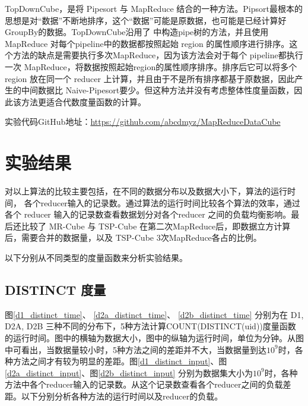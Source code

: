 TopDownCube，是将 Pipesort 与 MapReduce 结合的一种方法。Pipsort最根本的思想是对``数据”不断地排序，这个``数据”可能是原数据，也可能是已经计算好GroupBy的数据。TopDownCube沿用了\cite{agarwal1996computation} 中构造pipe树的方法，并且使用 MapReduce 对每个pipeline中的数据都按照起始 region 的属性顺序进行排序。这个方法的缺点是需要执行多次MapReduce，因为该方法会对于每个 pipeline都执行一次 MapReduce，将数据按照起始region的属性顺序排序。排序后它可以将多个 region 放在同一个 reducer 上计算，并且由于不是所有排序都基于原数据，因此产生的中间数据比 Naive-Pipesort要少。但这种方法并没有考虑整体性度量函数，因此该方法更适合代数度量函数的计算。

实验代码GitHub地址：\url{https://github.com/abcdmyz/MapReduceDataCube}

\section{实验结果}

对以上算法的比较主要包括，在不同的数据分布以及数据大小下，算法的运行时间， 各个reducer输入的记录数。通过算法的运行时间比较各个算法的效率，通过各个 reducer 输入的记录数查看数据划分对各个reducer 之间的负载均衡影响。最后还比较了 MR-Cube 与 TSP-Cube 在第二次MapReduce后，即数据立方计算后，需要合并的数据量，以及 TSP-Cube 3次MapReduce各占的比例。

以下分别从不同类型的度量函数来分析实验结果。

\subsection{DISTINCT 度量}


图\ref{d1_distinct_time}、 \ref{d2a_distinct_time}、 \ref{d2b_distinct_time} 分别为在 D1, D2A, D2B 三种不同的分布下，5种方法计算COUNT(DISTINCT(uid))度量函数的运行时间。图中的横轴为数据大小，图中的纵轴为运行时间，单位为分钟。从图中可看出，当数据量较小时，5种方法之间的差距并不大，当数据量到达${10}^{9}$时，各种方法之间才有较为明显的差距。图\ref{d1_distinct_input}、图\ref{d2a_distinct_input}、图\ref{d2b_distinct_input} 分别为数据集大小为${10}^{9}$时，各种方法中各个reducer输入的记录数。从这个记录数查看各个reducer之间的负载差距。以下分别分析各种方法的运行时间以及reducer的负载。

